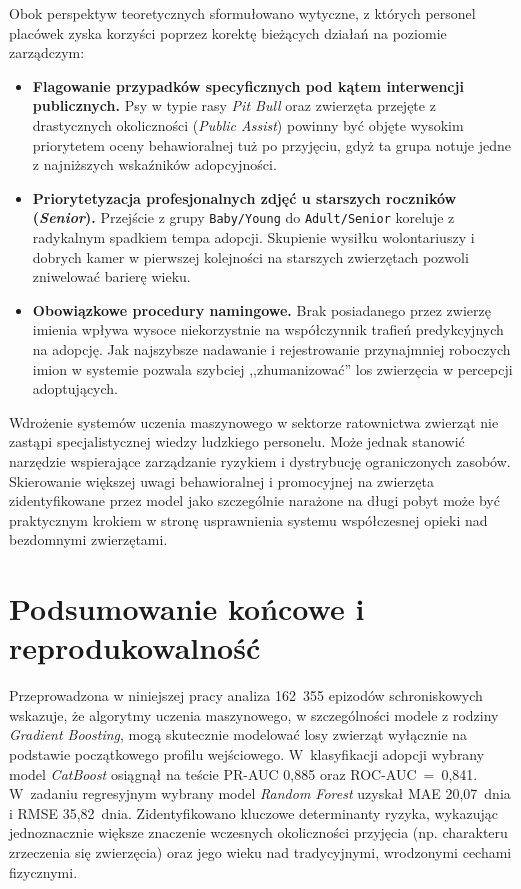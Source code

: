 Obok perspektyw teoretycznych sformułowano wytyczne, z których personel placówek zyska korzyści poprzez korektę bieżących działań na poziomie zarządczym:
\begin{itemize}
    \item \textbf{Flagowanie przypadków specyficznych pod kątem interwencji publicznych.} Psy w typie rasy \emph{Pit Bull} oraz zwierzęta przejęte z drastycznych okoliczności (\emph{Public Assist}) powinny być objęte wysokim priorytetem oceny behawioralnej tuż po przyjęciu, gdyż ta grupa notuje jedne z najniższych wskaźników adopcyjności.
    \item \textbf{Priorytetyzacja profesjonalnych zdjęć u starszych roczników (\emph{Senior}).} Przejście z grupy \texttt{Baby/Young} do \texttt{Adult/Senior} koreluje z radykalnym spadkiem tempa adopcji. Skupienie wysiłku wolontariuszy i dobrych kamer w pierwszej kolejności na starszych zwierzętach pozwoli zniwelować barierę wieku.
    \item \textbf{Obowiązkowe procedury namingowe.} Brak posiadanego przez zwierzę imienia wpływa wysoce niekorzystnie na współczynnik trafień predykcyjnych na adopcję. Jak najszybsze nadawanie i rejestrowanie przynajmniej roboczych imion w systemie pozwala szybciej ,,zhumanizować'' los zwierzęcia w percepcji adoptujących.
\end{itemize}


Wdrożenie systemów uczenia maszynowego w sektorze ratownictwa zwierząt nie zastąpi specjalistycznej wiedzy ludzkiego personelu. Może jednak stanowić narzędzie wspierające zarządzanie ryzykiem i dystrybucję ograniczonych zasobów. Skierowanie większej uwagi behawioralnej i promocyjnej na zwierzęta zidentyfikowane przez model jako szczególnie narażone na długi pobyt może być praktycznym krokiem w stronę usprawnienia systemu współczesnej opieki nad bezdomnymi zwierzętami.

\section{Podsumowanie końcowe i reprodukowalność}
\label{sec:podsumowanie-koncowe-reprodukowalnosc}

Przeprowadzona w niniejszej pracy analiza 162~355 epizodów schroniskowych wskazuje, że algorytmy uczenia maszynowego, w szczególności modele z rodziny \emph{Gradient Boosting}, mogą skutecznie modelować losy zwierząt wyłącznie na podstawie początkowego profilu wejściowego. W~klasyfikacji adopcji wybrany model \emph{CatBoost} osiągnął na teście PR-AUC 0,885 oraz ROC-AUC~=~0,841. W~zadaniu regresyjnym wybrany model \emph{Random Forest} uzyskał MAE 20,07~dnia i RMSE 35,82~dnia. Zidentyfikowano kluczowe determinanty ryzyka, wykazując jednoznacznie większe znaczenie wczesnych okoliczności przyjęcia (np. charakteru zrzeczenia się zwierzęcia) oraz jego wieku nad tradycyjnymi, wrodzonymi cechami fizycznymi.

